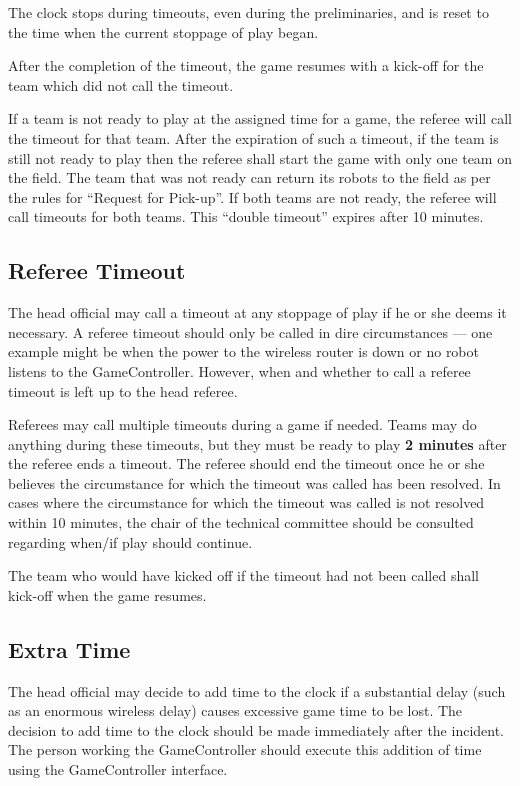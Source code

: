 The clock stops during timeouts, even during the preliminaries, and is reset to the time when the current stoppage of play began.

After the completion of the timeout, the game resumes with a kick-off for the team which did not call the timeout.

If a team is not ready to play at the assigned time for a game, the referee will call the timeout for that team. After the expiration of such a timeout, if the team is still not ready to play then the referee shall start the game with only one team on the field.  The team that was not ready can return its robots to the field as per the rules for ``Request for Pick-up''. If both teams are not ready, the referee will call timeouts for both teams. This ``double timeout'' expires after 10 minutes.

\subsection{Referee Timeout}
\label{sec:referee_timeout}
The head official may call a timeout at any stoppage of play if he or she deems it necessary.  A referee timeout should only be called in dire circumstances --- one example might be when the power to the wireless router is down or no robot listens to the GameController.  However, when and whether to call a referee timeout is left up to the head referee.

Referees may call multiple timeouts during a game if needed.  Teams may do anything during these timeouts, but they must be ready to play \textbf{2 minutes} after the referee ends a timeout.  The referee should end the timeout once he or she believes the circumstance for which the timeout was called has been resolved.  In cases where the circumstance for which the timeout was called is not resolved within 10 minutes, the chair of the technical committee should be consulted regarding when/if play should continue.

The team who would have kicked off if the timeout had not been called shall kick-off when the game resumes.

\subsection{Extra Time}
\label{sec:extra_time}
The head official may decide to add time to the clock if a substantial delay (such as an enormous wireless delay) causes excessive game time to be lost.  The decision to add time to the clock should be made immediately after the incident.  The person working the GameController should execute this addition of time using the GameController interface.

